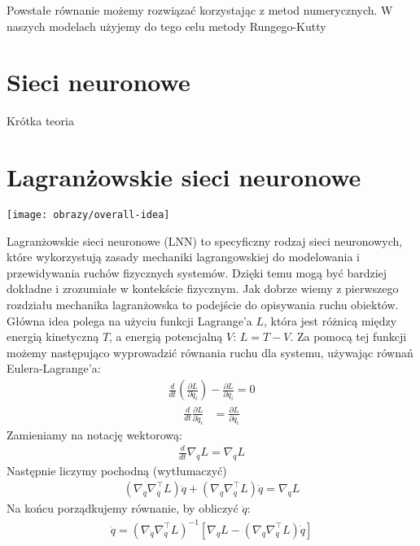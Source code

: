\documentclass[]{article}
\begin{document}
	Powstałe równanie możemy rozwiązać korzystając z metod numerycznych. W naszych modelach użyjemy do tego celu metody Rungego-Kutty
	
	
	\section{Sieci neuronowe}
	
	Krótka teoria
	
	
	
	
	
	
	\section{Lagranżowskie sieci neuronowe}
	
	\texttt{[image: obrazy/overall-idea]}
	
	Lagranżowskie sieci neuronowe (LNN) to specyficzny rodzaj sieci neuronowych, które wykorzystują zasady mechaniki lagrangowskiej do modelowania i przewidywania ruchów fizycznych systemów. Dzięki temu mogą być bardziej dokładne i zrozumiałe w kontekście fizycznym. Jak dobrze wiemy z pierwszego rozdziału mechanika lagranżowska to podejście do opisywania ruchu obiektów. Główna idea polega na użyciu funkcji Lagrange'a $L$, która jest różnicą między energią kinetyczną $T$, a energią potencjalną $V$: $L=T-V$.  
	Za pomocą tej funkcji możemy następująco wyprowadzić równania ruchu dla systemu, używając równań Eulera-Lagrange'a:
	\begin{align*}
		\frac{d}{dt} \left( \frac{\partial L}{\partial \dot{q}_i} \right) - \frac{\partial L}{\partial q_i} = 0  
	\end{align*}
	\begin{align*}
		\frac{d}{dt} \frac{\partial L}{\partial \dot{q}_i} &= \frac{\partial L}{\partial q_i} 
	\end{align*}
	Zamieniamy na notację wektorową:
	\begin{align*}
		\frac{d}{dt} \nabla_{\dot{q}} L = \nabla_q L
	\end{align*}
	Następnie liczymy pochodną (wytłumaczyć)
	\begin{align*}
		(\nabla_{\dot{q}} \nabla_{\dot{q}}^\top L) \ddot{q} + (\nabla_q \nabla_{\dot{q}}^\top L) \dot{q} = \nabla_q L
	\end{align*}
	Na końcu porządkujemy równanie, by obliczyć $\ddot{q}$:
	\begin{align*}
		\ddot{q} = (\nabla_{\dot{q}} \nabla_{\dot{q}}^\top L)^{-1} \left[ \nabla_q L - (\nabla_q \nabla_{\dot{q}}^\top L) \dot{q} \right]
	\end{align*}
	
\end{document}
